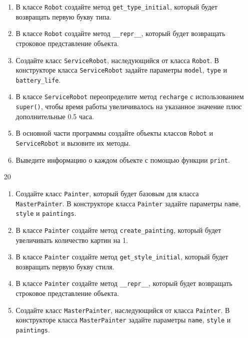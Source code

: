 \begin{enumerate}
\begin{enumerate}[leftmargin=*]
    \item В классе \texttt{Robot} создайте метод \texttt{get\_type\_initial}, который будет возвращать первую букву типа.
    
    \item В классе \texttt{Robot} создайте метод \texttt{\_\_repr\_\_}, который будет возвращать строковое представление объекта.
    
    \item Создайте класс \texttt{ServiceRobot}, наследующийся от класса \texttt{Robot}. В конструкторе класса \texttt{ServiceRobot} задайте параметры \texttt{model}, \texttt{type} и \texttt{battery\_life}.
    
    \item В классе \texttt{ServiceRobot} переопределите метод \texttt{recharge} с использованием \texttt{super()}, чтобы время работы увеличивалось на указанное значение плюс дополнительные 0.5 часа.
    
    \item В основной части программы создайте объекты классов \texttt{Robot} и \texttt{ServiceRobot} и вызовите их методы.
    
    \item Выведите информацию о каждом объекте с помощью функции \texttt{print}.
\end{enumerate}

\item[20] 
\begin{enumerate}[leftmargin=*]
    \item Создайте класс \texttt{Painter}, который будет базовым для класса \texttt{MasterPainter}. В конструкторе класса \texttt{Painter} задайте параметры \texttt{name}, \texttt{style} и \texttt{paintings}.
    
    \item В классе \texttt{Painter} создайте метод \texttt{create\_painting}, который будет увеличивать количество картин на 1.
    
    \item В классе \texttt{Painter} создайте метод \texttt{get\_style\_initial}, который будет возвращать первую букву стиля.
    
    \item В классе \texttt{Painter} создайте метод \texttt{\_\_repr\_\_}, который будет возвращать строковое представление объекта.
    
    \item Создайте класс \texttt{MasterPainter}, наследующийся от класса \texttt{Painter}. В конструкторе класса \texttt{MasterPainter} задайте параметры \texttt{name}, \texttt{style} и \texttt{paintings}.
    

\end{enumerate}
\end{enumerate}
